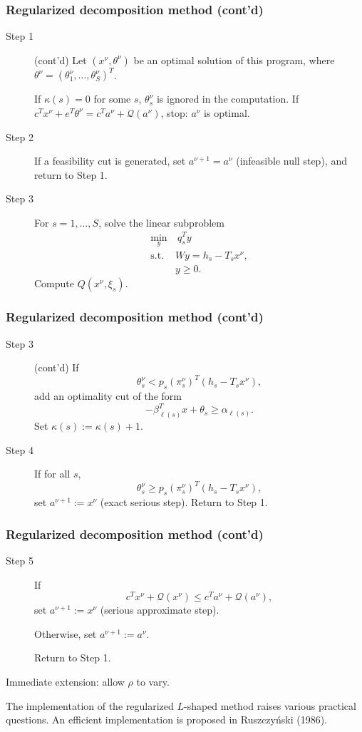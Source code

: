 \documentclass[aspectratio=169]{beamer}
\begin{document}
\begin{frame}
\frametitle{Regularized decomposition method (cont'd)}

\begin{description}
\item[Step 1] (cont'd)
Let $(x^{\nu}, \theta^{\nu})$ be an optimal solution of this program, where $\theta^{\nu} = (\theta^{\nu}_1,\ldots,\theta^{\nu}_S)^T$.

If $\kappa(s) = 0$ for some $s$, $\theta_s^{\nu}$ is ignored in the computation.
If $c^Tx^{\nu} + e^T\theta^{\nu} = c^Ta^{\nu} + \mathcal{Q}(a^{\nu})$, stop: $a^{\nu}$ is optimal.
\item[Step 2]
If a feasibility cut is generated, set $a^{\nu+1} = a^{\nu}$
(infeasible null step), and return to Step 1.
\item[Step 3]
For $s = 1,\ldots,S$, solve the linear subproblem
\begin{align*}
\min_y &\ q_s^Ty \\
\text{s.t. } & Wy = h_s - T_sx^{\nu}, \\
& y \geq 0.
\end{align*}
Compute $Q(x^{\nu}, \xi_s)$.
\end{description}

\end{frame}

\begin{frame}
\frametitle{Regularized decomposition method (cont'd)}

\begin{description}
\item[Step 3] (cont'd) If
\[
\theta_s^{\nu} < p_s (\pi_s^{\nu})^T(h_s - T_s x^{\nu}),
\]
add an optimality cut of the form
\[
-\beta^T_{\ell(s)} x + \theta_s \geq \alpha_{\ell(s)}.
\]
Set $\kappa(s) := \kappa(s)+1$.
\item[Step 4] If for all $s$,
\[
\theta_s^{\nu} \geq p_s (\pi_s^{\nu})^T(h_s - T_s x^{\nu}),
\]
set $a^{\nu+1} := x^{\nu}$ (exact serious step). Return to Step 1.
\end{description}

\end{frame}

\begin{frame}
\frametitle{Regularized decomposition method (cont'd)}

\begin{description}
\item[Step 5] If
\[
c^Tx^{\nu} + \mathcal{Q}(x^{\nu}) \leq c^Ta^{\nu} + \mathcal{Q}(a^{\nu}),
\]
set $a^{\nu+1} := x^{\nu}$ (serious approximate step).

Otherwise, set $a^{\nu+1} := a^{\nu}$.

Return to Step 1.
\end{description}

\mbox{}

{\blue Immediate extension}: allow $\rho$ to vary.

\mbox{}

The implementation of the regularized $L$-shaped method raises various practical questions.
An efficient implementation is proposed in Ruszczy\'nski (1986).
\end{frame}
\end{document}
